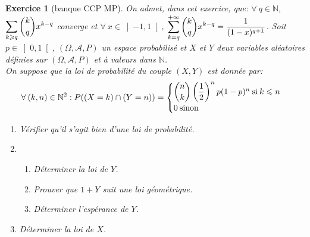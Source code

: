 \documentclass[12pt,a4paper,landscape]{article}
\newtheorem{Exo}{Exercice}
\begin{document}
\begin{Exo}[banque CCP MP]
	On admet, dans cet exercice, que:
	$\forall\:q\in \mathbb{N}$, $\displaystyle\sum\limits_{k\geqslant q}^{}\dbinom {k}{q}x^{k-q}$ converge et  $\forall \:x\in \left] -1,1\right[$,   $\displaystyle\sum\limits_{k=q}^{+\infty}\dbinom{k}{q}x^{k-q}=\dfrac{1}{(1-x)^{q+1}}$.
	Soit $p\in \left] 0,1\right[ $, $(\Omega,\mathcal{A},P)$ un espace probabilisé et $X$ et $Y$ deux variables aléatoires définies sur  $(\Omega,\mathcal{A},P)$ et à valeurs dans $\mathbb{N}$.\\
	On suppose que la loi de probabilité du  couple $(X,Y)$ est donnée par:\\
	\medskip
	$$\forall\:(k,n)\in\mathbb{N}^2:P((X=k)\cap (Y=n))=
	\begin{cases}
\dbinom{n}{k}\left( \dfrac{1}{2}\right)^np(1-p)^n\:\text{si}\:k\leqslant n\\
	0\:\text{sinon} 
	\end{cases}$$
	\begin{enumerate}
		\item
		Vérifier qu'il s'agit bien d'une loi de probabilité.
		\item
		\begin{enumerate}
			\item
			Déterminer la loi de $Y$.
			\item
			Prouver que $1+Y$ suit une loi géométrique.
			\item
			Déterminer l'espérance de $Y$.
		\end{enumerate}
		\item
		Déterminer la loi de $X$.
		
		
	\end{enumerate}
\end{Exo}
\end{document}

